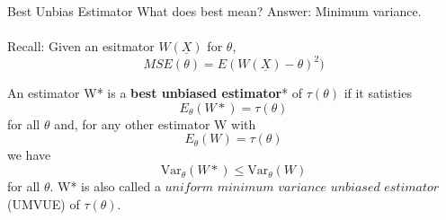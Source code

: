 \documentclass[11pt,fleqn]{book} %
\begin{document}
\begin{section}{Best Unbias Estimator}
	What does best mean? Answer: Minimum variance. \\
\\
	Recall: Given an esitmator $W(\underline{X})$ for $\theta$,
	\[
		MSE(\theta)= E(W(\underline{X})-\theta)^2)
	\]
\begin{definition}
	An estimator W* is a \textbf{best unbiased estimator}* of $\tau(\theta)$ if it satisties
	\[
		E_\theta (W*) = \tau(\theta)
	\] 
	for all $\theta$ and, for any other estimator W with 
	\[
		E_\theta (W) = \tau(\theta)
	\]
	we have 
	\[
		\text{Var}_\theta (W*) \le \text{Var}_\theta (W)
	\]
	for all $\theta$. W* is also called a $\textit{uniform minimum variance unbiased estimator}$ (UMVUE) of $\tau(\theta)$.
\end{definition}
\end{section}
\end{document}

